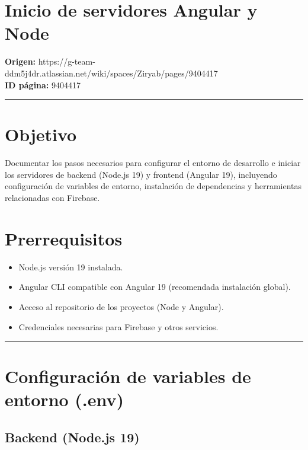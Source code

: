 \documentclass[
  spanish,
  11pt,
]{report}
\providecommand{\tightlist}{%
  \setlength{\itemsep}{0pt}\setlength{\parskip}{0pt}}
\begin{document}
\section{Inicio de servidores Angular y
Node}\label{inicio-de-servidores-angular-y-node}

\textbf{Origen:}
https://g-team-ddm5j4dr.atlassian.net/wiki/spaces/Ziryab/pages/9404417\\
\textbf{ID página:} 9404417

\begin{center}\rule{0.5\linewidth}{0.5pt}\end{center}

\section{Objetivo}\label{objetivo}

Documentar los pasos necesarios para configurar el entorno de desarrollo
e iniciar los servidores de backend (Node.js 19) y frontend (Angular
19), incluyendo configuración de variables de entorno, instalación de
dependencias y herramientas relacionadas con Firebase.

\section{Prerrequisitos}\label{prerrequisitos}

\begin{itemize}
\tightlist
\item
  Node.js versión 19 instalada.
\item
  Angular CLI compatible con Angular 19 (recomendada instalación
  global).
\item
  Acceso al repositorio de los proyectos (Node y Angular).
\item
  Credenciales necesarias para Firebase y otros servicios.
\end{itemize}

\begin{center}\rule{0.5\linewidth}{0.5pt}\end{center}

\section{Configuración de variables de entorno
(.env)}\label{configuraciuxf3n-de-variables-de-entorno-.env}

\subsection{Backend (Node.js 19)}\label{backend-node.js-19}
\end{document}
